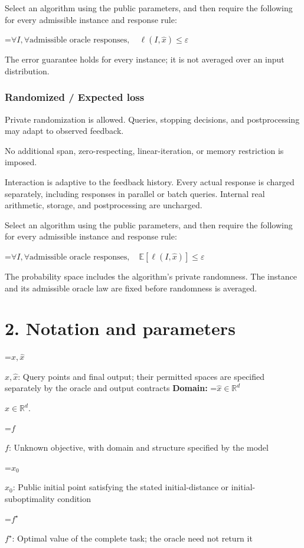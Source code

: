 \documentclass[10pt,a4paper]{article}
\newcommand{\AtlasMath}[1]{\par\begingroup\centering\setbox0=\hbox{$\displaystyle #1$}\ifdim\wd0>1.4\linewidth\typeout{ATLAS WIDE FORMULA: \the\wd0}\fi\ifdim\wd0>\linewidth\resizebox{\linewidth}{!}{\box0}\else\box0\fi\par\endgroup}
\newcommand{\AtlasInlineMath}[1]{\begingroup\setbox0=\hbox{$#1$}\ifdim\wd0>.4\linewidth\endgroup\AtlasMath{#1}\else\endgroup$#1$\fi}
\begin{document}
Select an algorithm using the public parameters, and then require the following for every admissible instance and response rule:


\AtlasMath{\forall I,\forall\text{admissible oracle responses},\quad\ell(I,\widehat{x})\le\varepsilon}


The error guarantee holds for every instance; it is not averaged over an input distribution.

\subsubsection{Randomized / Expected loss}
Private randomization is allowed. Queries, stopping decisions, and postprocessing may adapt to observed feedback.

No additional span, zero-respecting, linear-iteration, or memory restriction is imposed.

Interaction is adaptive to the feedback history. Every actual response is charged separately, including responses in parallel or batch queries. Internal real arithmetic, storage, and postprocessing are uncharged.

Select an algorithm using the public parameters, and then require the following for every admissible instance and response rule:


\AtlasMath{\forall I,\forall\text{admissible oracle responses},\quad\mathbb{E}[\ell(I,\widehat{x})]\le\varepsilon}


The probability space includes the algorithm's private randomness. The instance and its admissible oracle law are fixed before randomness is averaged.

\section{2. Notation and parameters}
\AtlasInlineMath{x,\widehat{x}}: Query points and final output; their permitted spaces are specified separately by the oracle and output contracts \textbf{Domain:} \AtlasInlineMath{\widehat{x}\in \mathbb{R}^d}.

\AtlasInlineMath{f}: Unknown objective, with domain and structure specified by the model

\AtlasInlineMath{x_0}: Public initial point satisfying the stated initial-distance or initial-suboptimality condition

\AtlasInlineMath{f^\star}: Optimal value of the complete task; the oracle need not return it
\end{document}
